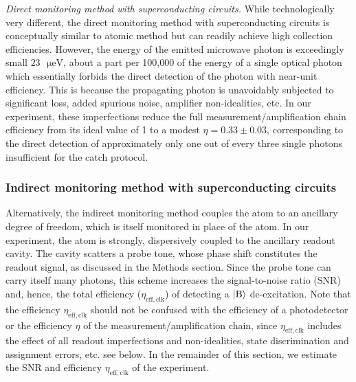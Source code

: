 \documentclass[
						superscriptaddress, 																 amsmath, amssymb,
		 aps,  prb,  
										floatfix,
		linenumbers,
			]{revtex4-1}
\begin{document}
\emph{Direct monitoring method with superconducting circuits.} While
technologically very different, the direct monitoring method with
superconducting circuits is conceptually similar to atomic method
but can readily achieve high collection efficiencies.\cite{Katz2008,Vijay2011,Riste2012-qubit-measure-reset,Vijay2012,Hatridge2013,Murch2013a,deLange2014,Roch2014,Weber2014,Campagne-Ibarcq2014,Macklin2015,Campagne2016-Fluorescence,Campagne-Ibarcq2016,Hacohen-Gourgy2016-non-comm,Naghiloo2016,White2016,Ficheux2017,Naghiloo2017-thermo,Tan2017,Hacohen-Gourgy2018,Heinsoo2018,Bultink2018}
 However, the energy of the emitted microwave photon is exceedingly
small \textemdash{} $23\text{ }\mathrm{\mu eV}$, about a part per
100,000 of the energy of a single optical photon \textemdash{} which
essentially forbids the direct detection of the photon with near-unit
efficiency. This is because the propagating photon is unavoidably
subjected to significant loss, added spurious noise, amplifier non-idealities,
etc. In our experiment, these imperfections reduce the full measurement/amplification
chain efficiency from its ideal value\cite{Hatridge2013,Macklin2015,Bultink2018}
of 1 to a modest $\eta=0.33\pm0.03$, corresponding to the direct
detection of approximately only one out of every three single photons
\textemdash{} insufficient for the catch protocol.

\subsubsection{Indirect monitoring method with superconducting circuits}

Alternatively, the indirect monitoring method couples the atom to
an ancillary degree of freedom, which is itself monitored in place
of the atom. In our experiment, the atom is strongly, dispersively
coupled to the ancillary readout cavity. The cavity scatters a probe
tone, whose phase shift constitutes the readout signal, as discussed
in the Methods section. Since the probe tone can carry itself many
photons, this scheme increases the signal-to-noise ratio ($\mathrm{SNR}$)
and, hence, the total efficiency ($\eta_{\mathrm{eff,clk}}$) of detecting
a $|{\rm B}\rangle$ de-excitation. Note that the efficiency $\eta_{\mathrm{eff,clk}}$
should not be confused with the efficiency of a photodetector or the
efficiency $\eta$ of the measurement/amplification chain, since $\eta_{\mathrm{eff,clk}}$
includes the effect of all readout imperfections and non-idealities,
state discrimination and assignment errors, etc. see below. In the
remainder of this section, we estimate the SNR and efficiency $\eta_{\mathrm{eff,clk}}$
of the experiment.
\end{document}
